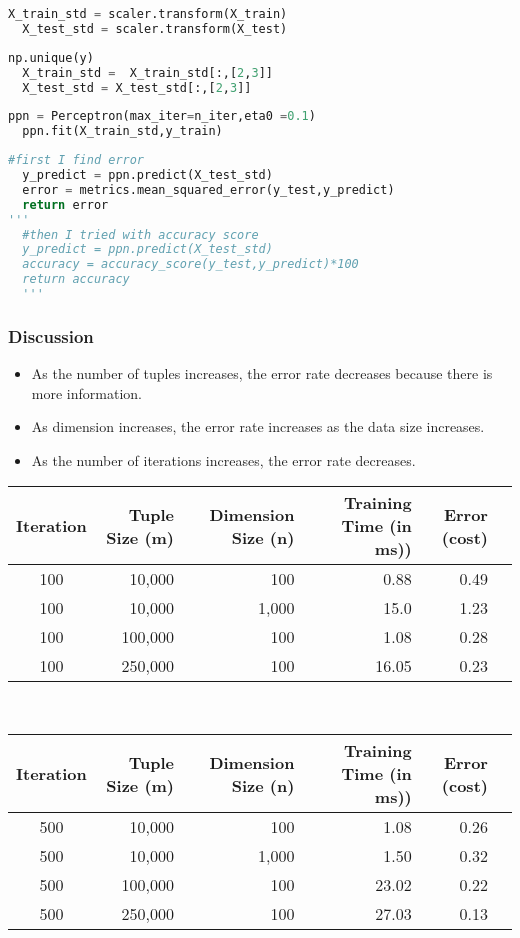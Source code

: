 \documentclass[onecolumn]{article}
\begin{document}
\begin{lstlisting}[language=Python, caption= transform] 
  X_train_std = scaler.transform(X_train)
  X_test_std = scaler.transform(X_test)
\end{lstlisting} 

\begin{lstlisting}[language=Python, caption= select a subset of the features as before.] 
 np.unique(y)
  X_train_std =  X_train_std[:,[2,3]]
  X_test_std = X_test_std[:,[2,3]]
\end{lstlisting} 

\begin{lstlisting}[language=Python, caption= Perceptron] 
  ppn = Perceptron(max_iter=n_iter,eta0 =0.1)
  ppn.fit(X_train_std,y_train)
\end{lstlisting} 

\begin{lstlisting}[language=Python, caption= Calculation of error ] 
  #first I find error 
  y_predict = ppn.predict(X_test_std)
  error = metrics.mean_squared_error(y_test,y_predict)
  return error
'''
  #then I tried with accuracy score
  y_predict = ppn.predict(X_test_std)
  accuracy = accuracy_score(y_test,y_predict)*100
  return accuracy
  '''
\end{lstlisting} 

\subsubsection{Discussion}
\label{sec:2}

\begin{itemize}
\item As the number of tuples increases, the error rate decreases because there is more information.
\item As dimension increases, the error rate increases as the data size increases.
\item As the number of iterations increases, the error rate decreases.
\end{itemize}


\begin {tabular}{crrrrl}
\hline
Iteration &Tuple Size (m)& Dimension Size (n)  & Training Time (in ms))
& Error (cost)
  \\
\hline
  100&10,000
 &100&0.88&0.49\\
100&10,000
 &1,000&15.0&1.23\\
 100&100,000
&100&1.08&0.28\\ 100&250,000
&100&16.05&0.23\\ 
\hline
\end{tabular}
\\
\begin {tabular}{crrrrl}
\hline
Iteration &Tuple Size (m)& Dimension Size (n)  & Training Time (in ms))
& Error (cost)
  \\
\hline
 500 &10,000
 &100&1.08&0.26\\
500&10,000
 &1,000&1.50&0.32\\
 500& 100,000
&100&23.02&0.22\\ 500& 250,000
&100&27.03&0.13\\ 
\hline
\end{tabular}
\\
\end{document}
